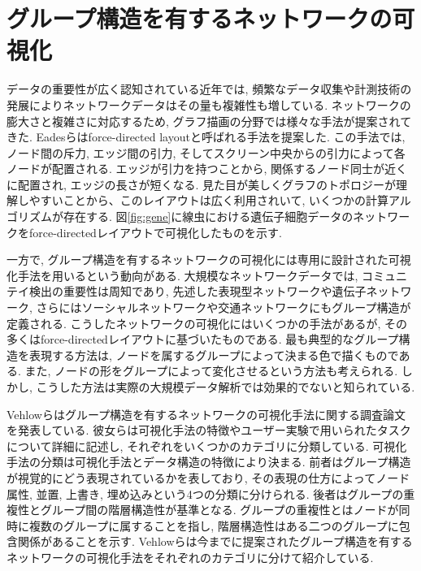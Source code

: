 \documentclass{kuee}
\begin{document}
\section{グループ構造を有するネットワークの可視化}
\label{sec:graph_for_group_structure}
データの重要性が広く認知されている近年では, 頻繁なデータ収集や計測技術の発展によりネットワークデータはその量も複雑性も増している.
ネットワークの膨大さと複雑さに対応するため, グラフ描画の分野では様々な手法が提案されてきた.
Eadesらはforce-directed layoutと呼ばれる手法を提案した\cite{eades84}.
この手法では, ノード間の斥力, エッジ間の引力, そしてスクリーン中央からの引力によって各ノードが配置される.
エッジが引力を持つことから, 関係するノード同士が近くに配置され, エッジの長さが短くなる.
見た目が美しくグラフのトポロジーが理解しやすいことから、このレイアウトは広く利用されいて\cite{Kobourov2013ForceDirectedDA}, いくつかの計算アルゴリズムが存在する\cite{harel2000fast,koren2003drawing,hachul2004drawing}.
図\ref{fig:gene}に線虫における遺伝子細胞データのネットワークをforce-directedレイアウトで可視化したものを示す.

一方で, グループ構造を有するネットワークの可視化には専用に設計された可視化手法を用いるという動向がある.
大規模なネットワークデータでは, コミュニテイ検出の重要性は周知であり, 先述した表現型ネットワークや遺伝子ネットワーク, さらにはソーシャルネットワークや交通ネットワークにもグループ構造が定義される.
こうしたネットワークの可視化にはいくつかの手法があるが, その多くはforce-directedレイアウトに基づいたものである.
最も典型的なグループ構造を表現する方法は, ノードを属するグループによって決まる色で描くものである\cite{mcpherson2005discovering}.{}
また, ノードの形をグループによって変化させるという方法も考えられる.
しかし, こうした方法は実際の大規模データ解析では効果的でないと知られている.

Vehlowらはグループ構造を有するネットワークの可視化手法に関する調査論文を発表している\cite{Vehlow2017VisualizingGS}.
彼女らは可視化手法の特徴やユーザー実験で用いられたタスクについて詳細に記述し, それぞれをいくつかのカテゴリに分類している.
可視化手法の分類は可視化手法とデータ構造の特徴により決まる.
前者はグループ構造が視覚的にどう表現されているかを表しており, その表現の仕方によってノード属性, 並置, 上書き, 埋め込みという4つの分類に分けられる.
後者はグループの重複性とグループ間の階層構造性が基準となる.
グループの重複性とはノードが同時に複数のグループに属することを指し, 階層構造性はある二つのグループに包含関係があることを示す.
Vehlowらは今までに提案されたグループ構造を有するネットワークの可視化手法をそれぞれのカテゴリに分けて紹介している.
\end{document}
